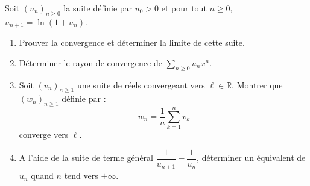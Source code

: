 \documentclass[a4paper,twoside,french,11pt]{VcCours}
\begin{document}
\begin{Exercice}{} Soit $(u_n)_{n \geq 0}$ la suite définie par $u_0 >0$ et pour tout $n \geq 0$, $u_{n+1}= \ln(1+u_n)$.
\begin{enumerate}
\item Prouver la convergence et déterminer la limite de cette suite.
\item Déterminer le rayon de convergence de $\sum_{n \geq 0} u_n x^n$.
\item Soit $(v_n)_{n \geq 1}$ une suite de réels convergeant vers $\ell \in \mathbb{R}$. Montrer que $(w_n)_{n \geq 1}$ définie par :
$$ w_n = \dfrac{1}{n} \sum_{k=1}^n v_k$$
converge vers $\ell$.
\item A l'aide de la suite de terme général $\dfrac{1}{u_{n+1}} - \dfrac{1}{u_n}$, déterminer un équivalent de $u_n$ quand $n$ tend vers $+ \infty$.
\end{enumerate}
\end{Exercice}
\end{document}
